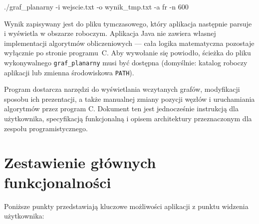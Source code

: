 \documentclass[a4paper, 11pt]{article}
\begin{document}
\begin{cmdbox}
./graf\_planarny -i wejscie.txt -o wynik\_tmp.txt -a fr -n 600
\end{cmdbox}

Wynik zapisywany jest do pliku tymczasowego, kt\'ory aplikacja nast\k{e}pnie parsuje i wy\'swietla w obszarze roboczym. Aplikacja Java nie zawiera w\l{}asnej implementacji algorytm\'ow obliczeniowych --- ca\l{}a logika matematyczna pozostaje wy\l{}\k{a}cznie po stronie programu~C. Aby wywo\l{}anie si\k{e} powiod\l{}o, \'scie\.zka do pliku wykonywalnego \texttt{graf\_planarny} musi by\'c dost\k{e}pna (domy\'slnie: katalog roboczy aplikacji lub zmienna \'srodowiskowa \texttt{PATH}).

Program dostarcza narz\k{e}dzi do wy\'swietlania wczytanych graf\'ow, modyfikacji sposobu ich prezentacji, a tak\.ze manualnej zmiany pozycji w\k{e}z\l{}\'ow i uruchamiania algorytm\'ow przez program C. Dokument ten jest jednocze\'snie instrukcj\k{a} dla u\.zytkownika, specyfikacj\k{a} funkcjonaln\k{a} i opisem architektury przeznaczonym dla zespo\l{}u programistycznego.

\section{Zestawienie g\l{}ównych funkcjonalno\'sci}

Poni\.zsze punkty przedstawiaj\k{a} kluczowe mo\.zliwo\'sci aplikacji z punktu widzenia u\.zytkownika:
\end{document}
